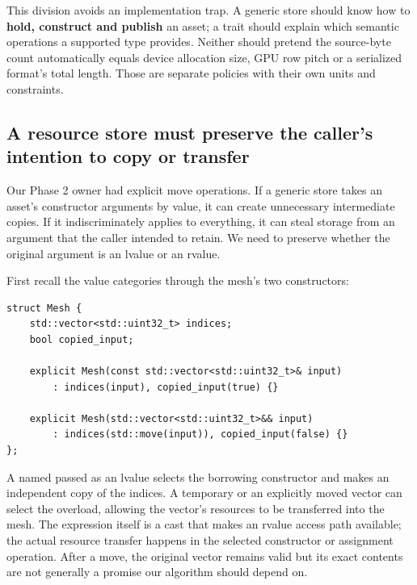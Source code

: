 This division avoids an implementation trap. A generic store should know how to \textbf{hold, construct and publish} an asset; a trait should explain which semantic operations a supported type provides. Neither should pretend the source-byte count automatically equals device allocation size, GPU row pitch or a serialized format's total length. Those are separate policies with their own units and constraints.

\subsection{A resource store must preserve the caller's intention to copy or transfer}\label{01-foundations-i-ch005-a-resource-store-must-preserve-the-callers-intention-to-copy-or-transfer}

\hypertarget{01-foundations-i-ch005-a-resource-store-must-preserve-the-callers-intention-to-copy-or-transfer}{}

Our Phase 2 owner had explicit move operations. If a generic store takes an asset's constructor arguments by value, it can create unnecessary intermediate copies. If it indiscriminately applies  to everything, it can steal storage from an argument that the caller intended to retain. We need to preserve whether the original argument is an lvalue or an rvalue.

First recall the value categories through the mesh's two constructors:

\begin{verbatim}
struct Mesh {
    std::vector<std::uint32_t> indices;
    bool copied_input;

    explicit Mesh(const std::vector<std::uint32_t>& input)
        : indices(input), copied_input(true) {}

    explicit Mesh(std::vector<std::uint32_t>&& input)
        : indices(std::move(input)), copied_input(false) {}
};
\end{verbatim}

A named  passed as an lvalue selects the borrowing  constructor and makes an independent copy of the indices. A temporary or an explicitly moved vector can select the \BookInlineCode{{\&}{\&}}{\&\&} overload, allowing the vector's resources to be transferred into the mesh. The  expression itself is a cast that makes an rvalue access path available; the actual resource transfer happens in the selected constructor or assignment operation. After a move, the original vector remains valid but its exact contents are not generally a promise our algorithm should depend on.

